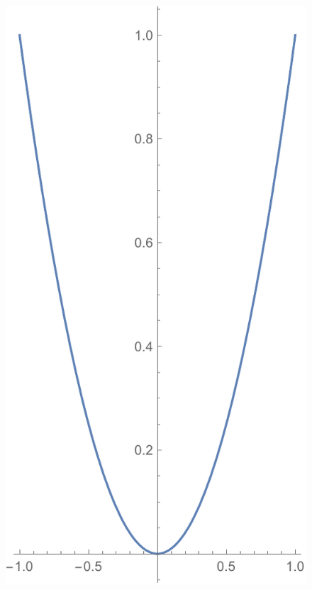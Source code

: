 \documentclass[a4paper, 12pt]{article}
\begin{document}
\begin{itemize}
		\newpage 
		\begin{figure}[!h]
			\centering
			\includegraphics[scale=.55]{images/aspectdouble}
		\end{figure}
	

\end{itemize}
\end{document}
